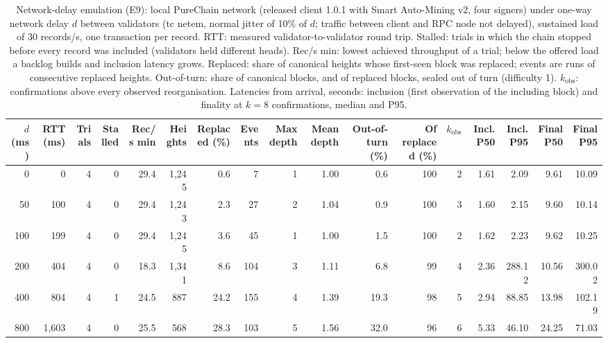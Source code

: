 \begin{table}[t]
\centering
\scriptsize
\caption{Network-delay emulation (E9): local PureChain network (released client 1.0.1 with Smart Auto-Mining v2, four signers) under one-way network delay $d$ between validators (tc netem, normal jitter of 10\% of $d$; traffic between client and RPC node not delayed), sustained load of 30 records/s, one transaction per record. RTT: measured validator-to-validator round trip. Stalled: trials in which the chain stopped before every record was included (validators held different heads). Rec/s min: lowest achieved throughput of a trial; below the offered load a backlog builds and inclusion latency grows. Replaced: share of canonical heights whose first-seen block was replaced; events are runs of consecutive replaced heights. Out-of-turn: share of canonical blocks, and of replaced blocks, sealed out of turn (difficulty 1). $k_{\mathrm{obs}}$: confirmations above every observed reorganisation. Latencies from arrival, seconds: inclusion (first observation of the including block) and finality at $k=8$ confirmations, median and P95.}
\label{tab:netdelay}
\begin{adjustbox}{max width=\textwidth}
\begin{tabular}{rrrrrrrrrrrrrrrrr}
\toprule
$d$ (ms) & RTT (ms) & Trials & Stalled & Rec/s min & Heights & Replaced (\%) & Events & Max depth & Mean depth & Out-of-turn (\%) & Of replaced (\%) & $k_{\mathrm{obs}}$ & Incl. P50 & Incl. P95 & Final P50 & Final P95 \\
\midrule
0 & 0 & 4 & 0 & 29.4 & 1,245 & 0.6 & 7 & 1 & 1.00 & 0.6 & 100 & 2 & 1.61 & 2.09 & 9.61 & 10.09 \\
50 & 100 & 4 & 0 & 29.4 & 1,243 & 2.3 & 27 & 2 & 1.04 & 0.9 & 100 & 3 & 1.60 & 2.15 & 9.60 & 10.14 \\
100 & 199 & 4 & 0 & 29.4 & 1,245 & 3.6 & 45 & 1 & 1.00 & 1.5 & 100 & 2 & 1.62 & 2.23 & 9.62 & 10.25 \\
200 & 404 & 4 & 0 & 18.3 & 1,341 & 8.6 & 104 & 3 & 1.11 & 6.8 & 99 & 4 & 2.36 & 288.12 & 10.56 & 300.02 \\
400 & 804 & 4 & 1 & 24.5 & 887 & 24.2 & 155 & 4 & 1.39 & 19.3 & 98 & 5 & 2.94 & 88.85 & 13.98 & 102.19 \\
800 & 1,603 & 4 & 0 & 25.5 & 568 & 28.3 & 103 & 5 & 1.56 & 32.0 & 96 & 6 & 5.33 & 46.10 & 24.25 & 71.03 \\
\bottomrule
\end{tabular}\end{adjustbox}
\end{table}
